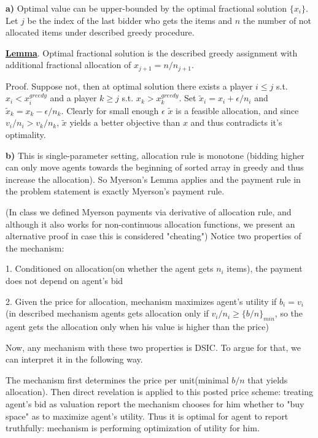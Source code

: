 \textbf{a)} Optimal value can be upper-bounded by the optimal fractional solution $\{x_i\}$. Let $j$ be the index of the last bidder who gets the items and $n$ the number of not allocated items under described greedy procedure. 

\textbf{\uline{Lemma}}. Optimal fractional solution is the described greedy assignment with additional fractional allocation of $x_{j+1} = n/ n_{j+1}$.

Proof. Suppose not, then at optimal solution there exists a player $i\leq j$ s.t. $x_i<x_i^{greedy}$ and a player $k\geq j$ s.t. $x_k>x_k^{greedy}$. Set $\tilde x_i=x_i+\epsilon/n_i$ and $\tilde x_k = x_k - \epsilon/n_k$. Clearly for small enough $\epsilon$ $\tilde x$ is a feasible allocation, and since $v_i/n_i>v_k/n_k$, $\tilde x$ yields a better objective than $x$ and thus contradicts it's optimality.

\textbf{b)} This is single-parameter setting, allocation rule is monotone (bidding higher can only move agents towards the beginning of sorted array in greedy and thus increase the allocation). So Myerson's Lemma applies and the payment rule in the problem statement is exactly Myerson's payment rule. 

(In class we defined Myerson payments via derivative of allocation rule, and although it also works for non-continuous allocation functions, we present an alternative proof in case this is considered "cheating") Notice two properties of the mechanism:

1. Conditioned on allocation(on whether the agent gets $n_i$ items), the payment does not depend on agent's bid
\bigskip

2. Given the price for allocation, mechanism maximizes agent's utility if $b_i=v_i$ (in described mechanism agents gets allocation only if $v_i/n_i\geq \{b/n\}_{min}$, so the agent gets the allocation only when his value is higher than the price)

\bigskip

Now, any mechanism with these two properties is DSIC. To argue for that, we can interpret it in the following way. 
\bigskip

The mechanism first determines the price per unit(minimal $b/n$ that yields allocation). Then direct revelation is applied to this posted price scheme: treating agent's bid as valuation report the mechanism chooses for him whether to "buy space" as to maximize agent's utility. Thus it is optimal for agent to report truthfully: mechanism is performing optimization of utility for him.


